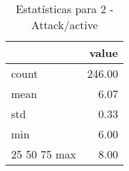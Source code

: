 \begin{table}[htbp]
\caption{Estatísticas para 2 - Attack/active}
\label{tab:2_-_attack_active_summary}
\begin{tabular}{lr}
\toprule
 & value \\
\midrule
count & 246.00 \\
mean & 6.07 \\
std & 0.33 \\
min & 6.00 \\
25%
50%
75%
max & 8.00 \\
\bottomrule
\end{tabular}
\end{table}

